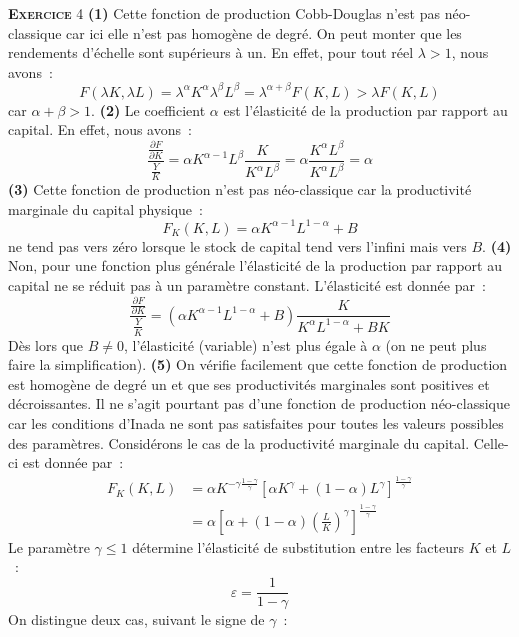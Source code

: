 \documentclass[10pt,a4paper,notitlepage]{report}
\newcommand{\exercice}[1]{\textsc{\textbf{Exercice}} #1}
\newcommand{\question}[1]{\textbf{(#1)}}
\begin{document}
\exercice{4}  \question{1} Cette  fonction de  production Cobb-Douglas
n'est pas néo-classique  car ici elle n'est pas homogène  de degré. On
peut monter  que les  rendements d'échelle sont  supérieurs à  un. En
effet, pour tout réel $\lambda>1$, nous avons :
\[
F(\lambda K, \lambda L) = \lambda^{\alpha}K^{\alpha}\lambda^{\beta}L^{\beta} = \lambda^{\alpha+\beta}F(K,L)>\lambda F(K,L)
\]
car  $\alpha+\beta>1$.   \question{2}  Le  coefficient   $\alpha$  est
l'élasticité de la  production par rapport au capital.  En effet, nous
avons :
\[
\frac{\frac{\partial F}{\partial K}}{\frac{Y}{K}} = \alpha K^{\alpha-1}L^{\beta}\frac{K}{K^{\alpha}L^{\beta}} = \alpha\frac{K^{\alpha}L^{\beta}}{K^{\alpha}L^{\beta}} = \alpha
\]
\question{3} Cette fonction de  production n'est pas néo-classique car
la productivité marginale du capital physique :
\[
F_K(K,L) = \alpha K^{\alpha-1}L^{1-\alpha} + B
\]  
ne tend pas  vers zéro lorsque le stock de  capital tend vers l'infini
mais  vers $B$.  \question{4}  Non, pour  une  fonction plus  générale
l'élasticité de la production par rapport  au capital ne se réduit pas
à un paramètre constant. L'élasticité est donnée par :
\[
\frac{\frac{\partial F}{\partial K}}{\frac{Y}{K}} = \left(\alpha K^{\alpha-1}L^{1-\alpha}+B\right)\frac{K}{K^{\alpha}L^{1-\alpha}+BK}
\]
Dès lors  que $B\neq  0$, l'élasticité (variable)  n'est plus  égale à
$\alpha$ (on ne  peut plus faire la  simplification).  \question{5} On
vérifie facilement  que cette fonction  de production est  homogène de
degré  un  et  que  ses productivités  marginales  sont  positives  et
décroissantes. Il ne s'agit pourtant  pas d'une fonction de production
néo-classique car les conditions d'Inada  ne sont pas satisfaites pour
toutes les valeurs possibles des  paramètres. Considérons le cas de la
productivité marginale du capital. Celle-ci est donnée par :
\[
\begin{split}
F_K(K,L) &= \alpha K^{-\gamma\frac{1-\gamma}{\gamma}}\left[\alpha K^{\gamma} + (1-\alpha)L^{\gamma}\right]^{\frac{1-\gamma}{\gamma}}\\
&= \alpha \left[\alpha + (1-\alpha)\left(\frac{L}{K}\right)^{\gamma}\right]^{\frac{1-\gamma}{\gamma}}
\end{split}
\]
Le paramètre $\gamma\leq 1$ détermine l'élasticité de substitution entre les facteurs $K$ et $L$ : 
\[
\varepsilon = \frac{1}{1-\gamma} 
\]
On distingue deux cas, suivant le signe de $\gamma$ :
\end{document}
